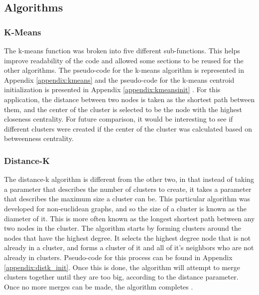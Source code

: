 \documentclass[12pt]{article}
\begin{document}
\subsection{Algorithms}

\subsubsection{K-Means}
The k-means function was broken into five different sub-functions. This helps improve readability of the code and allowed some sections to be reused for the other algorithms. The pseudo-code for the k-means algorithm is represented in Appendix \ref{appendix:kmeans} and the pseudo-code for the k-means centroid initialization is presented in Appendix \ref{appendix:kmeansinit} \cite{kmeans}. For this application, the distance between two nodes is taken as the shortest path between them, and the center of the cluster is selected to be the node with the highest closeness centrality. For future comparison, it would be interesting to see if different clusters were created if the center of the cluster was calculated based on betweenness centrality.

\subsubsection{Distance-K}
The distance-k algorithm is different from the other two, in that instead of taking a parameter that describes the number of clusters to create, it takes a parameter that describes the maximum size a cluster can be. This particular algorithm was developed for non-euclidean graphs, and so the size of a cluster is known as the diameter of it. This is more often known as the longest shortest path between any two nodes in the cluster.
\newline\newline
The algorithm starts by forming clusters around the nodes that have the highest degree. It selects the highest degree node that is not already in a cluster, and forms a cluster of it and all of it's neighbors who are not already in clusters. Pseudo-code for this process can be found in Appendix \ref{appendix:distk_init}. Once this is done, the algorithm will attempt to merge clusters together until they are too big, according to the distance parameter. Once no more merges can be made, the algorithm completes \cite{kernel}.
\end{document}
